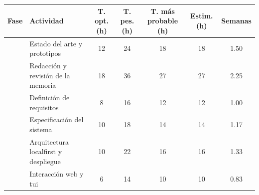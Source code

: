 \begin{table}[p]
    \centering
    \scriptsize
    \setlength{\tabcolsep}{2.5pt}
    \renewcommand{\arraystretch}{1.12}
    \begin{tabularx}{\textwidth}{
            |>{\raggedright\arraybackslash}p{2.2cm}
            |>{\raggedright\arraybackslash}X
            |S[table-format=2.0]
            |S[table-format=2.0]
            |S[table-format=2.0]
            |S[table-format=3.0]
            |S[table-format=2.2]|
        }
        \hline
        \textbf{Fase}                        & \textbf{Actividad}                                  & {\textbf{T. opt. (h)}} & {\textbf{T. pes. (h)}} & {\textbf{T. más probable (h)}} & {\textbf{Estim. (h)}}               & {\textbf{Semanas}} \\
        \hline
                                             & Estado del arte y prototipos                        & 12                     & 24                     & 18                             & 18                                  & 1.50               \\
                                             & Redacción y revisión de la memoria                  & 18                     & 36                     & 27                             & 27                                  & 2.25               \\
        \hline
                                             & Definición de requisitos                            & 8                      & 16                     & 12                             & 12                                  & 1.00               \\
                                             & Especificación del sistema                          & 10                     & 18                     & 14                             & 14                                  & 1.17               \\
        \hline
                                             & Arquitectura \gls{localfirst} y despliegue          & 10                     & 22                     & 16                             & 16                                  & 1.33               \\
                                             & Interacción web y \gls{tui}                         & 6                      & 14                     & 10                             & 10                                  & 0.83               \\

\end{tabularx}
\end{table}
